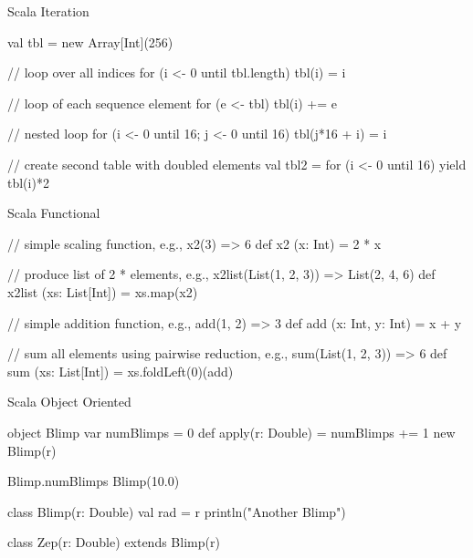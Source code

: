 \documentclass[xcolor=pdflatex,dvipsnames,table]{beamer}
\begin{document}
\begin{frame}[fragile]{Scala Iteration}
\begin{scala}
val tbl = new Array[Int](256)

// loop over all indices
for (i <- 0 until tbl.length)
  tbl(i) = i

// loop of each sequence element
for (e <- tbl)
  tbl(i) += e

// nested loop
for (i <- 0 until 16; j <- 0 until 16)
  tbl(j*16 + i) = i

// create second table with doubled elements
val tbl2 = for (i <- 0 until 16) yield tbl(i)*2
\end{scala}
\end{frame}

\begin{frame}[fragile]{Scala Functional}
\begin{scala}
// simple scaling function, e.g., x2(3) => 6
def x2 (x: Int) = 2 * x
\end{scala}

\begin{scala}
// produce list of 2 * elements, e.g., x2list(List(1, 2, 3)) => List(2, 4, 6)
def x2list (xs: List[Int]) = xs.map(x2)
\end{scala}

\begin{scala}
// simple addition function, e.g., add(1, 2) => 3
def add (x: Int, y: Int) = x + y
\end{scala}

\begin{scala}
// sum all elements using pairwise reduction, e.g., sum(List(1, 2, 3)) => 6
def sum (xs: List[Int]) = xs.foldLeft(0)(add)
\end{scala}
\end{frame}

\begin{frame}[fragile]{Scala Object Oriented}

\begin{scala}
object Blimp {
  var numBlimps = 0
  def apply(r: Double) = {
    numBlimps += 1
    new Blimp(r)
  }
}

Blimp.numBlimps
Blimp(10.0)

class Blimp(r: Double) {
  val rad = r
  println("Another Blimp")
}

class Zep(r: Double) extends Blimp(r)
\end{scala}

\end{frame}
\end{document}
